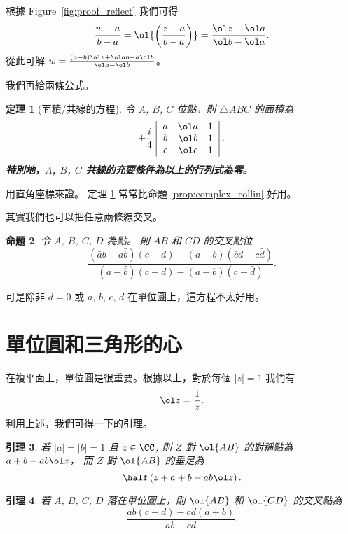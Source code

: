 \documentclass[11pt]{scrartcl}
\newtheorem{theorem}{\color{blue!40!black}定理}
\newtheorem{lemma}[theorem]{\color{blue!40!black}引理}
\newtheorem{proposition}[theorem]{\color{blue!40!black}命題}
\theoremstyle{definition}
\let\oldendproof\endproof
\renewenvironment{proof}[1][證]{%
  \oldproof[\bfseries 【#1】\nopunct]%
}{\oldendproof}
\begin{document}
\begin{proof}
  根據 Figure~\ref{fig:proof_reflect} 我們可得
  \[ \frac{w-a}{b-a} = \ol{\left( \frac{z-a}{b-a} \right)} = \frac{\ol z - \ol a}{\ol b - \ol a}. \]
  從此可解 $w = \frac{(a-b)\ol z + \ol a b - a \ol b}{\ol a-  \ol b}$。
\end{proof}

我們再給兩條公式。

\begin{theorem}
  [面積/共線的方程] 令 $A$, $B$, $C$ 位點。則 $\triangle ABC$ 的面積為
  \[
    \pm \frac{i}{4}
    \left\lvert
    \begin{array}{ccc}
      a & \ol a & 1 \\
      b & \ol b & 1 \\
      c & \ol c & 1 \\
    \end{array}
    \right\rvert.
  \]
  \textbf{特別地，$A$, $B$, $C$ 共線的充要條件為以上的行列式為零。}
  \label{thm:complex_shoelace}
\end{theorem}
\begin{proof}
  用直角座標來證。
\end{proof}
定理 \ref{thm:complex_shoelace} 常常比命題 \ref{prop:complex_collin} 好用。

其實我們也可以把任意兩條線交叉。
\begin{proposition}
  令 $A$, $B$, $C$, $D$ 為點。 則 $AB$ 和 $CD$ 的交叉點位
  \[ \frac{ (\bar a b - a \bar b )(c-d) - (a-b)(\bar c d - c \bar d) }{(\bar a - \bar b )(c-d) - (a-b)(\bar c - \bar d)}. \]
  \label{prop:complex_intersect}
\end{proposition}
可是除非 $d=0$ 或 $a$, $b$, $c$, $d$ 在單位圓上，這方程不太好用。


\section{單位圓和三角形的心}
\label{sec:unitcircle}
在複平面上，單位圓是很重要。根據以上，對於每個 $\left\lvert z \right\rvert = 1$ 我們有 \[ \ol z = \frac 1z. \]
利用上述，我們可得一下的引理。

\begin{lemma}
  若 $ \left\lvert a \right\rvert = \left\lvert b \right\rvert = 1$ 且 $z \in \CC$, 則 $Z$ 對 $\ol{AB}$ 的對稱點為
  $a+b-ab \ol z$，
  而 $Z$ 對 $\ol{AB}$ 的垂足為
  \[ \half \left( z+a+b -ab \ol z \right). \]
\end{lemma}
\begin{lemma}
  若 $A$, $B$, $C$, $D$ 落在單位圓上，則 $\ol{AB}$ 和 $\ol{CD}$ 的交叉點為
  \[ \frac{ab(c+d)-cd(a+b)}{ab-cd}. \]
\end{lemma}
\end{document}
